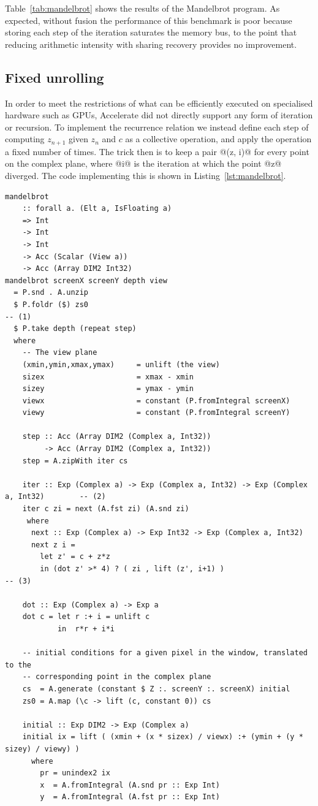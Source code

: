 Table~\ref{tab:mandelbrot} shows the results of the Mandelbrot program. As
expected, without fusion the performance of this benchmark is poor because
storing each step of the iteration saturates the memory bus, to the point that
reducing arithmetic intensity with sharing recovery provides no improvement.


\subsection{Fixed unrolling}

In order to meet the restrictions of what can be efficiently executed on
specialised hardware such as GPUs, Accelerate did not directly support any form
of iteration or recursion. To implement the recurrence relation we instead
define each step of computing $z_{n+1}$ given $z_n$ and $c$ as a collective
operation, and apply the operation a fixed number of times. The trick then is to
keep a pair @(z, i)@ for every point on the complex plane, where @i@ is the
iteration at which the point @z@ diverged. The code implementing this is shown
in Listing~\ref{lst:mandelbrot}.

\begin{lstlisting}[style=haskell_float
    ,label=lst:mandelbrot
    ,caption={Mandelbrot set generator, using fixed unrolling}]
mandelbrot
    :: forall a. (Elt a, IsFloating a)
    => Int
    -> Int
    -> Int
    -> Acc (Scalar (View a))
    -> Acc (Array DIM2 Int32)
mandelbrot screenX screenY depth view
  = P.snd . A.unzip
  $ P.foldr ($) zs0                                                                    -- (1)
  $ P.take depth (repeat step)
  where
    -- The view plane
    (xmin,ymin,xmax,ymax)     = unlift (the view)
    sizex                     = xmax - xmin
    sizey                     = ymax - ymin
    viewx                     = constant (P.fromIntegral screenX)
    viewy                     = constant (P.fromIntegral screenY)

    step :: Acc (Array DIM2 (Complex a, Int32))
         -> Acc (Array DIM2 (Complex a, Int32))
    step = A.zipWith iter cs

    iter :: Exp (Complex a) -> Exp (Complex a, Int32) -> Exp (Complex a, Int32)        -- (2)
    iter c zi = next (A.fst zi) (A.snd zi)
     where
      next :: Exp (Complex a) -> Exp Int32 -> Exp (Complex a, Int32)
      next z i =
        let z' = c + z*z
        in (dot z' >* 4) ? ( zi , lift (z', i+1) )                                     -- (3)

    dot :: Exp (Complex a) -> Exp a
    dot c = let r :+ i = unlift c
            in  r*r + i*i

    -- initial conditions for a given pixel in the window, translated to the
    -- corresponding point in the complex plane
    cs  = A.generate (constant $ Z :. screenY :. screenX) initial
    zs0 = A.map (\c -> lift (c, constant 0)) cs

    initial :: Exp DIM2 -> Exp (Complex a)
    initial ix = lift ( (xmin + (x * sizex) / viewx) :+ (ymin + (y * sizey) / viewy) )
      where
        pr = unindex2 ix
        x  = A.fromIntegral (A.snd pr :: Exp Int)
        y  = A.fromIntegral (A.fst pr :: Exp Int)
\end{lstlisting}

